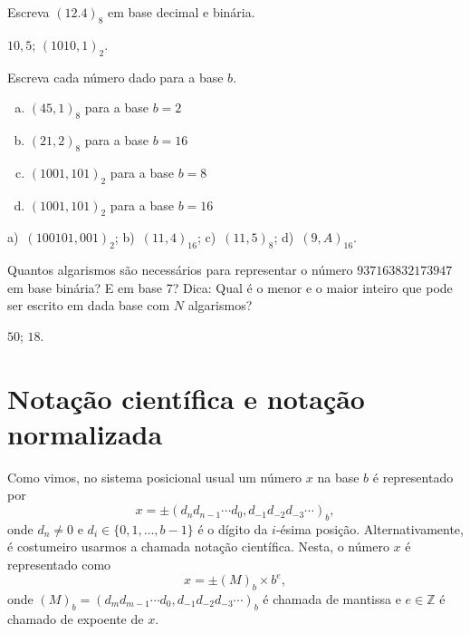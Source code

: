 \begin{exer}
  Escreva $(12.4)_8$ em base decimal e binária.
\end{exer}
\begin{resp}
    $10,5$; $(1010,1)_2$.
\end{resp}

\begin{exer} Escreva cada número dado para a base $b$.
  \begin{enumerate}[a)]
  \item[a)] $(45,1)_8$ para a base $b=2$
  \item[b)] $(21,2)_8$ para a base $b=16$
  \item[c)] $(1001,101)_2$ para a base $b=8$
  \item[d)] $(1001,101)_2$ para a base $b=16$
  \end{enumerate}
\end{exer}
\begin{resp}
  a)~$(100101,001)_2$; b)~$(11,4)_{16}$; c)~$(11,5)_8$; d)~$(9,A)_{16}$.
\end{resp}

\begin{exer} Quantos algarismos são necessários para representar o número $937163832173947$ em base binária? E em base 7? Dica: Qual é o menor e o maior inteiro que pode ser escrito em dada base com $N$ algarismos?
\end{exer}
\begin{resp}
  $50$; $18$.
\end{resp}

\section{Notação científica e notação normalizada}

Como vimos, no sistema posicional usual um número $x$ na base $b$ é representado por
\begin{equation}
  x = \pm (d_{n}d_{n-1}\cdots d_{0},d_{-1}d_{-2}d_{-3}\cdots)_b,
\end{equation}
onde $d_{n}\neq 0$ e $d_i\in\{0, 1, \dotsc, b-1\}$ é o dígito da $i$-ésima posição. Alternativamente, é costumeiro usarmos a chamada notação científica. Nesta, o número $x$ é representado como
\begin{equation}
  x = \pm (M)_b\times b^e,
\end{equation}
onde $(M)_b = (d_{m}d_{m-1}\cdots d_{0},d_{-1}d_{-2}d_{-3}\cdots)_b$ é chamada de mantissa e $e\in\mathbb{Z}$ é chamado de expoente de $x$.

